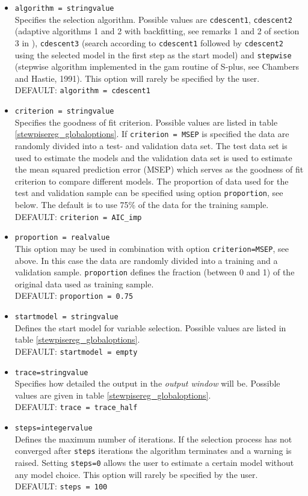 \begin{itemize}
\item {\tt algorithm = stringvalue} \\
Specifies the selection algorithm. Possible values are {\tt cdescent1}, {\tt cdescent2} (adaptive algorithms  1 and 2 with backfitting, see remarks 1 and 2 of section 3 in
), {\tt cdescent3} (search according to {\tt cdescent1}  followed by {\tt cdescent2}  using the
selected model in the first step as the start model) and {\tt stepwise} (stepwise algorithm implemented in the gam routine
of S-plus, see Chambers and Hastie, 1991).
This option will rarely be specified by the user. \\
DEFAULT: {\tt algorithm = cdescent1}
\item {\tt criterion = stringvalue} \\
Specifies the goodness of  fit criterion. Possible values are listed in table \autoref{stewpisereg_globaloptions}. If {\tt criterion = MSEP} is specified
the data are randomly divided into a test- and validation data set. The test data set is used to estimate the models and the validation data set is used to
estimate the mean squared prediction error (MSEP) which serves as the goodness of fit criterion to compare different models. The proportion of data used for
the test and validation sample can be specified using option {\tt proportion}, see below. The default is to use 75\% of the data for the training sample. \\
DEFAULT: {\tt criterion = AIC\_imp}
\item {\tt proportion = realvalue} \\
This option may be used in combination with option {\tt criterion=MSEP}, see above. In this case the data are randomly divided into
a training and a validation sample. {\tt proportion} defines the fraction (between 0 and 1)  of the original data used as training sample. \\
DEFAULT: {\tt proportion = 0.75}
\item {\tt startmodel = stringvalue} \\
Defines the start model for variable selection. Possible values are listed in table \autoref{stewpisereg_globaloptions}. \\
DEFAULT: {\tt startmodel = empty}
\item {\tt trace=stringvalue} \\
Specifies how detailed the output in the {\it output window} will be. Possible values are given in table \autoref{stewpisereg_globaloptions}. \\
DEFAULT: {\tt trace = trace\_half}
\item {\tt steps=integervalue}   \\
Defines the maximum number of iterations.  If the selection process  has not converged after {\tt steps} iterations the algorithm terminates and a warning is
raised. Setting {\tt steps=0} allows the user to estimate a certain model without any model choice. This option will rarely be specified by the user.\\
DEFAULT: {\tt steps = 100}
\end{itemize}


